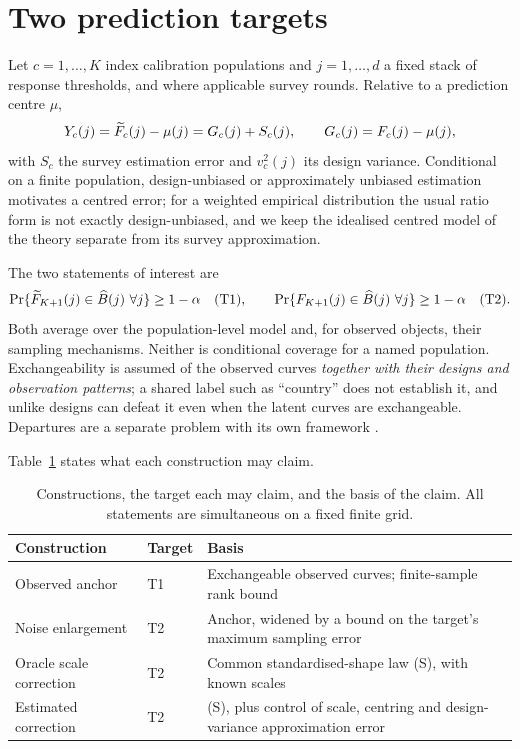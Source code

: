 \section{Two prediction targets}\label{sec:targets}

Let $c=1,\dots,K$ index calibration populations and $j=1,\dots,d$ a fixed stack
of response thresholds, and where applicable survey rounds. Relative to a
prediction centre $\mu$,
\begin{equation}\label{eq:decomp}
Y_c(j)=\widetilde{F}_c(j)-\mu(j)=G_c(j)+S_c(j),\qquad G_c(j)=F_c(j)-\mu(j),
\end{equation}
with $S_c$ the survey estimation error and $v_c^2(j)$ its design variance.
Conditional on a finite population, design-unbiased or approximately unbiased
estimation motivates a centred error; for a weighted empirical distribution the
usual ratio form is not exactly design-unbiased, and we keep the idealised
centred model of the theory separate from its survey approximation.

The two statements of interest are
\begin{equation}\label{eq:t1t2}
\Pr\{\widetilde{F}_{K+1}(j)\in\widehat{B}(j)\ \forall j\}\ge 1-\alpha
\quad\text{(T1)},\qquad
\Pr\{F_{K+1}(j)\in\widehat{B}(j)\ \forall j\}\ge 1-\alpha
\quad\text{(T2)}.
\end{equation}
Both average over the population-level model and, for observed objects, their
sampling mechanisms. Neither is conditional coverage for a named population.
Exchangeability is assumed of the observed curves \emph{together with their
designs and observation patterns}; a shared label such as ``country'' does not
establish it, and unlike designs can defeat it even when the latent curves are
exchangeable. Departures are a separate problem with its own
framework \citep{barber2023conformal}.

Table~\ref{tab:targets} states what each construction may claim.

\begin{table}[htbp]\centering
\caption{Constructions, the target each may claim, and the basis of the claim.
All statements are simultaneous on a fixed finite grid.}\label{tab:targets}
\begin{tabular}{p{.24\linewidth}p{.20\linewidth}p{.46\linewidth}}\toprule
Construction & Target & Basis\\\midrule
Observed anchor & T1 & Exchangeable observed curves; finite-sample rank bound\\
Noise enlargement & T2 & Anchor, widened by a bound on the target's maximum sampling error\\
Oracle scale correction & T2 & Common standardised-shape law (S), with known scales\\
Estimated correction & T2 & (S), plus control of scale, centring and design-variance approximation error\\
\bottomrule\end{tabular}
\end{table}

